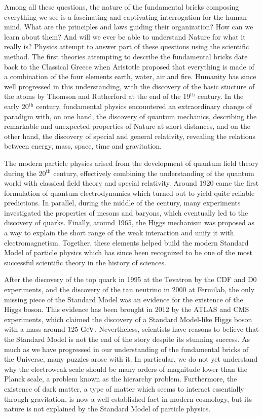 Among all these questions, the nature of the fundamental bricks composing everything we
see is a fascinating and captivating interrogation for the human mind. What are the principles
and laws guiding their organization? How can we learn about them? And will we ever be
able to understand Nature for what it really is? Physics attempt to answer part of these
questions using the scientific method. The first theories attempting to describe
the fundamental bricks date back to the Classical Greece when Aristotle proposed that
everything is made of a combination of the four elements earth, water, air and fire.
Humanity has since well progressed in this understanding, with the discovery of the basic
stucture of the atoms by Thomson and Rutherford at the end of the 19$^\text{th}$ century.
In the early 20$^\text{th}$ century, fundamental physics encountered an extraordinary
change of paradigm with, on one hand, the discovery of quantum mechanics, describing the
remarkable and unexpected properties of Nature at short distances, and on the other hand,
the discovery of special and general relativity, revealing the relations between energy,
mass, space, time and gravitation.

The modern particle physics arised from the development of quantum field theory during
the 20$^\text{th}$ century, effectively combining the understanding of the
quantum world with classical field theory and special relativity. Around 1920 came the first
formulation of quantum electrodynamics which turned out to yield quite reliable predictions.
In parallel, during the middle of the century, many experiments investigated the properties
of mesons and baryons, which eventually led to the discovery of quarks. Finally, around
1965, the Higgs mechanism was proposed as a way to explain the short range of the weak
interaction and unify it with electromagnetism. Together, these elements helped build the
modern Standard Model of particle physics which has since been recognized to be one of the
most successful scientific theory in the history of sciences.

After the discovery of the top quark in 1995 at the Tevatron by the CDF and D0 experiments,
and the discovery of the tau neutrino in 2000 at Fermilab,
the only missing piece of the Standard Model was an evidence for the existence of the Higgs
boson. This evidence has been brought in 2012 by the ATLAS and CMS experiments,
which claimed the discovery of a Standard Model-like Higgs boson with a mass around
$125~\text{GeV}$. Nevertheless, scientists have reasons to believe that the Standard Model is not
the end of the story despite its stunning success. As much as we have progressed in our
understanding of the fundamental bricks of the Universe, many puzzles arose with it. In
particular, we do not yet understand why the electroweak scale should be many orders of
magnitude lower than the Planck scale, a problem known as the hierarchy
problem. Furthermore, the existence of dark matter, a type of matter which seems to interact
essentially through gravitation, is now a well established fact in modern cosmology, but
its nature is not explained by the Standard Model of particle physics.

